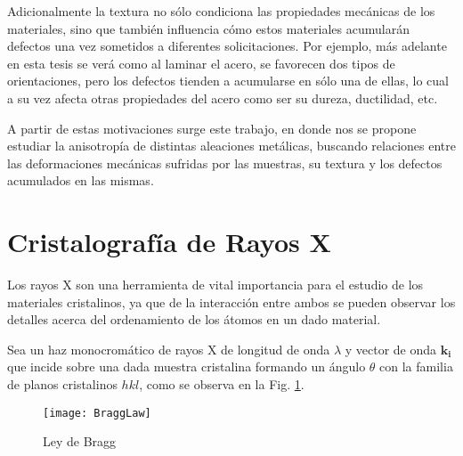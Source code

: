 Adicionalmente la textura no sólo condiciona las propiedades mecánicas de los materiales, sino que también influencia cómo estos materiales acumularán defectos una vez sometidos a diferentes solicitaciones. 
Por ejemplo, más adelante en esta tesis se verá como al laminar el acero, se favorecen dos tipos de orientaciones, pero los defectos tienden a acumularse en sólo una de ellas, lo cual a su vez afecta otras propiedades del acero como ser su dureza, ductilidad, etc.

A partir de estas motivaciones surge este trabajo, en donde nos se propone estudiar la anisotropía de distintas aleaciones metálicas, buscando relaciones entre las deformaciones mecánicas sufridas por las muestras, su textura y los defectos acumulados en las mismas.

\section{Cristalografía de Rayos X}\label{S:DRX}
Los rayos X son una herramienta de vital importancia para el estudio de los materiales cristalinos, ya que de la interacción entre ambos se pueden observar los detalles acerca del ordenamiento de los átomos en un dado material.

Sea un haz monocromático de rayos X de longitud de onda $\lambda$ y vector de onda $\mathbf{k_i}$ que incide sobre una dada muestra cristalina formando un ángulo $\theta$ con la familia de planos cristalinos ${hkl}$, como se observa en la Fig. \ref{fig:Bragg}.

\begin{figure}[htb!]
  \centering
  \texttt{[image: BraggLaw]}
  \caption{Ley de Bragg}
  \label{fig:Bragg}
\end{figure}

